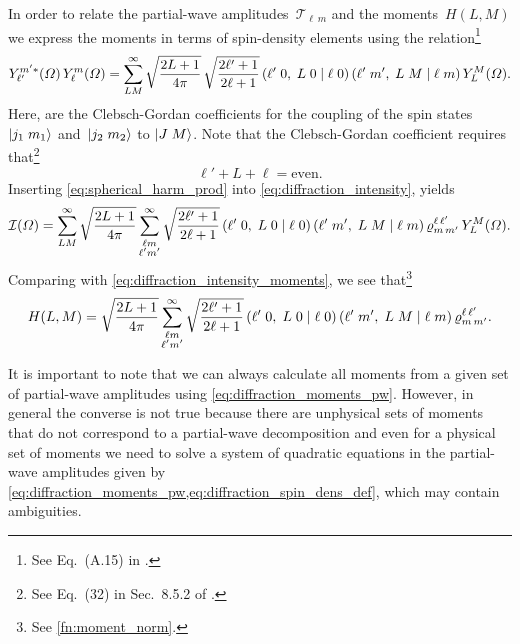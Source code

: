 In order to relate the partial-wave amplitudes~$\mathcal{T}_{\ell\,
m}$ and the moments~$H(L, M)$ we express the moments in terms of
spin-density elements using the relation\footnote{See Eq.~(A.15) in
.}
\begin{equation}
  \label{eq:spherical_harm_prod}
  Y_{\ell'}^{m' *}(\Omega)\, Y_{\ell}^m(\Omega)
  = \sum_{L M}^\infty \sqrt{\frac{2 L + 1}{4 \pi}}\, \sqrt{\frac{2 \ell' + 1}{2 \ell + 1}}\, ({\ell'}\;{0},\;{L}\;{0}\; |\; {\ell}\;{0})\, ({\ell'}\;{m'},\;{L}\;{M}\; |\; {\ell}\;{m})\, Y_L^M(\Omega).
\end{equation}
Here,  are the Clebsch-Gordan
coefficients for the coupling of the spin states $\ket{j_1\; m_1}$
and~$\ket{j_2\; m_2}$ to $\ket{J\; M}$.  Note that the Clebsch-Gordan
coefficient  requires
that\footnote{See Eq.~(32) in Sec.~8.5.2 of
.}
\begin{equation}
  \label{eq:ang_mom_sum}
  \ell' + L + \ell
  = \text{even}.
\end{equation}
Inserting \cref{eq:spherical_harm_prod} into
\cref{eq:diffraction_intensity}, yields
\begin{equation}
  \mathcal{I}(\Omega)
  = \sum_{L M}^\infty \sqrt{\frac{2 L + 1}{4 \pi}} \sum_{\substack{\ell m \\ \ell' m'}}^\infty
  \sqrt{\frac{2 \ell' + 1}{2 \ell + 1}}\, ({\ell'}\;{0},\;{L}\;{0}\; |\; {\ell}\;{0})\, ({\ell'}\;{m'},\;{L}\;{M}\; |\; {\ell}\;{m})\,
  \varrho^{\ell\, \ell'}_{m\, m'}\, Y_L^M(\Omega).
\end{equation}
Comparing with \cref{eq:diffraction_intensity_moments}, we see
that\footnote{See \cref{fn:moment_norm}.}
\begin{equation}
  \label{eq:diffraction_moments_pw}
  H(L, M)
  = \sqrt{\frac{2 L + 1}{4 \pi}} \sum_{\substack{\ell m \\ \ell' m'}}^\infty
  \sqrt{\frac{2 \ell' + 1}{2 \ell + 1}}\,
  ({\ell'}\;{0},\;{L}\;{0}\; |\; {\ell}\;{0})\, ({\ell'}\;{m'},\;{L}\;{M}\; |\; {\ell}\;{m})\,
  \varrho^{\ell\, \ell'}_{m\, m'}.
\end{equation}

It is important to note that we can always calculate all moments from
a given set of partial-wave amplitudes using
\cref{eq:diffraction_moments_pw}.  However, in general the converse is
not true because there are unphysical sets of moments that do not
correspond to a partial-wave decomposition and even for a physical set
of moments we need to solve a system of quadratic equations in the
partial-wave amplitudes given by
\cref{eq:diffraction_moments_pw,eq:diffraction_spin_dens_def}, which
may contain ambiguities.

